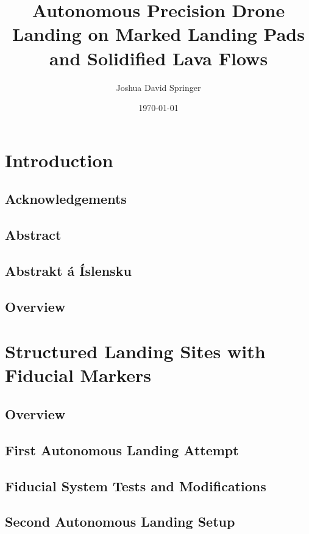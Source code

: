 \documentclass[10pt,twoside,b5paper]{book}
\author{Joshua David Springer}
\title{Autonomous Precision Drone Landing on Marked Landing Pads and Solidified Lava Flows}
\date{\specialdate\today}
\begin{document}
	\frontmatter
	
	

	\tableofcontents
	\newpage
	

	\mainmatter
	\chapter{Introduction}
		
		\newpage

		\section{Acknowledgements}
		
		\newpage

		\section{Abstract}
		
		\newpage

		\section{Abstrakt á Íslensku}
		
		\newpage

		\section{Overview}
		
		\newpage

	\chapter{Structured Landing Sites with Fiducial Markers}
		\section{Overview}
		\section{First Autonomous Landing Attempt}
		\section{Fiducial System Tests and Modifications}
		\section{Second Autonomous Landing Setup}
\end{document}
